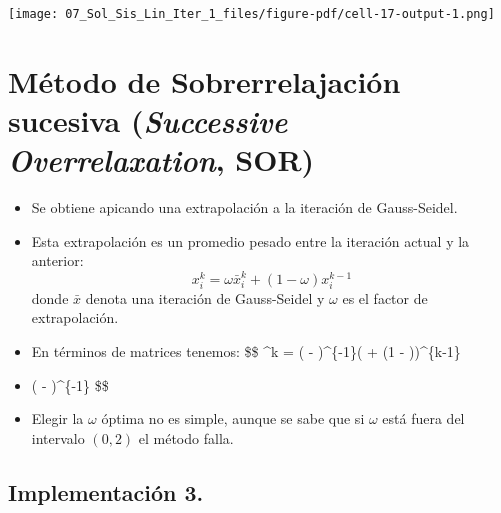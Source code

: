 \documentclass[
  letterpaper,
  DIV=11,
  numbers=noendperiod]{scrreprt}
\begin{document}
\texttt{[image: 07\_Sol\_Sis\_Lin\_Iter\_1\_files/figure-pdf/cell-17-output-1.png]}


\chapter{\texorpdfstring{Método de Sobrerrelajación sucesiva
(\emph{Successive Overrelaxation},
SOR)}{Método de Sobrerrelajación sucesiva (Successive Overrelaxation, SOR)}}\label{muxe9todo-de-sobrerrelajaciuxf3n-sucesiva-successive-overrelaxation-sor}

\begin{itemize}
\item
  Se obtiene apicando una extrapolación a la iteración de Gauss-Seidel.
\item
  Esta extrapolación es un promedio pesado entre la iteración actual y
  la anterior: \[
  x_i^k = \omega \bar{x}_i^k + (1-\omega)x_i^{k-1}
  \] donde \(\bar{x}\) denota una iteración de Gauss-Seidel y \(\omega\)
  es el factor de extrapolación.
\item
  En términos de matrices tenemos: \$\$ \^{}k = ( -
  \omega {})\^{}\{-1\}(\omega {} + (1 -
  \omega ))\^{}\{k-1\}
\item
  \omega ( - \omega {})\^{}\{-1\}  \$\$
\item
  Elegir la \(\omega\) óptima no es simple, aunque se sabe que si
  \(\omega\) está fuera del intervalo \((0,2)\) el método falla.
\end{itemize}

\section{Implementación 3.}\label{implementaciuxf3n-3.}
\end{document}

